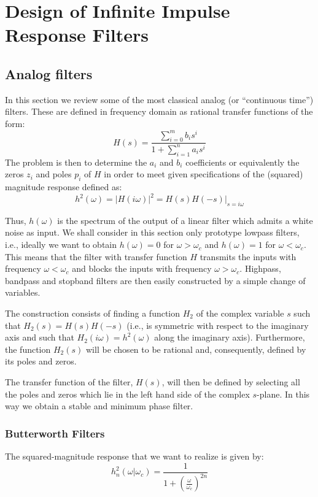 \chapter[IIR Filters]{Design of Infinite Impulse Response Filters}
\label{iir}

\section{Analog filters}
In this section we review some of the most classical analog (or ``continuous time'') filters.
These are defined in frequency domain as rational transfer functions of the form:
$$H(s)=\frac{\sum_{i=0}^{m}{b_i s ^i}}{1+\sum_{i=1}^{n}{a_i s ^i}}$$
The problem is then to determine the $a_i$ and $b_i$ coefficients or equivalently the zeros $z_i$ and poles $p_i$ of $H$ in order to meet given specifications of the (squared) magnitude response defined as: 
\begin{equation}
\label{hhh}
h^2(\omega)={\vert H(i\omega) \vert}^2={H(s)H(-s) \vert _{s=i\omega}}
\end{equation}

Thus, $h(\omega)$ is the spectrum of the output of a linear filter which admits a white noise as input.
We shall consider in this section only prototype lowpass filters, i.e., ideally we want to obtain $h(\omega) = 0$ for $\omega > \omega_c$ and $h(\omega) = 1$ for $\omega < \omega_c$.
This means that the filter with transfer function $H$ transmits the inputs with frequency $\omega < \omega_c$ and blocks the inputs with frequency $\omega > \omega_c$.
Highpass, bandpass and stopband filters are then easily constructed by a simple change of variables.

The construction consists of finding a function $H_2$ of the complex variable $s$ such that $H_2(s) = H(s)H(-s)$ (i.e., 
is symmetric with respect to the imaginary axis and 
such that $H_2(i \omega) = h^2(\omega)$ along the imaginary axis).
Furthermore, the function $H_2(s)$ will be chosen to be rational and, 
consequently,  defined by its poles and zeros.

The transfer function of the filter, $H(s)$,  will then be 
defined by selecting all the poles and zeros which lie in the left hand
side of the complex $s$-plane.
In this way we obtain a stable and minimum phase filter.

\subsection{Butterworth Filters}
The squared-magnitude response that we want to realize is given by:
\begin{equation}
\label{real}
h_n^2(\omega \vert \omega_c)=\frac{1}{1+{(\frac{\omega}{ \omega_c})}^{2n}}
\end{equation}

